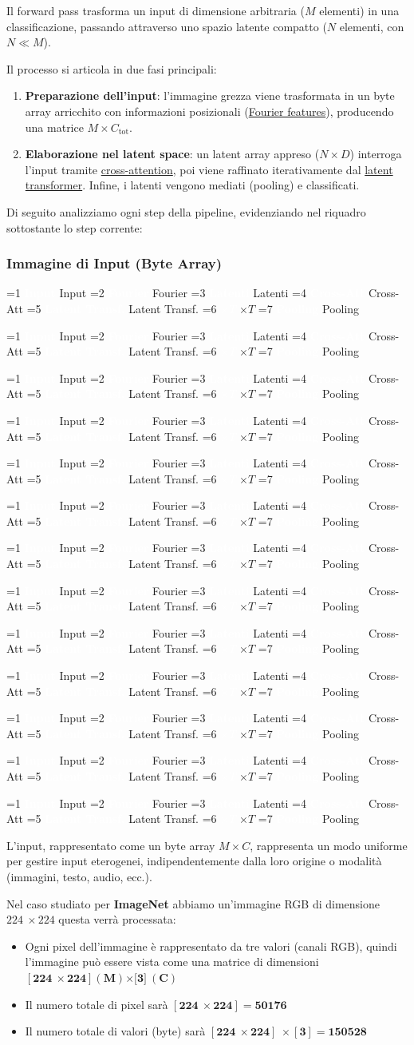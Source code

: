 \documentclass[
  11pt,
]{article}
\newcommand{\pipelinestep}[2]{%
  \ifnum#2=1
    \tikz[baseline=(n.base)]{\node[draw=seccolor, fill=seccolor!15, rounded corners=2pt,
      inner sep=2pt, font=\footnotesize\bfseries] (n) {#1};}%
  \else
    \tikz[baseline=(n.base)]{\node[draw=boxframe, rounded corners=2pt,
      inner sep=2pt, font=\footnotesize] (n) {#1};}%
  \fi
}
\newcommand{\parr}{{\footnotesize\;$\to$\;}}
\newcommand{\pipeline}[1]{%
\begin{tcolorbox}[colback=white, colframe=seccolor!60, boxrule=0.6pt, arc=4pt,
  left=4pt, right=4pt, top=5pt, bottom=5pt, title={\footnotesize\bfseries\color{white} Forward Pass Pipeline}, fonttitle=\footnotesize, coltitle=white, colbacktitle=seccolor!70]
\centering
\pipelinestep{Input}{%
  \ifnum#1=1 1\else 0\fi}%
\parr\pipelinestep{Fourier}{%
  \ifnum#1=2 1\else 0\fi}%
\parr\pipelinestep{Embedding}{%
  \ifnum#1=3 1\else 0\fi}%
\parr\pipelinestep{Latent Array}{%
  \ifnum#1=4 1\else 0\fi}%
\parr\pipelinestep{Cross-Att}{%
  \ifnum#1=5 1\else 0\fi}%
\parr\pipelinestep{Res+MLP}{%
  \ifnum#1=6 1\else 0\fi}%
\\[4pt]
\pipelinestep{Latent Transf.}{%
  \ifnum#1=7 1\else 0\fi}%
\parr\pipelinestep{Res+MLP}{%
  \ifnum#1=8 1\else 0\fi}%
\parr\pipelinestep{$\times T$}{%
  \ifnum#1=9 1\else 0\fi}%
\parr\pipelinestep{Pooling}{%
  \ifnum#1=10 1\else 0\fi}%
\parr\pipelinestep{Classifier}{%
  \ifnum#1=11 1\else 0\fi}%
\parr\pipelinestep{Loss}{%
  \ifnum#1=12 1\else 0\fi}%
\end{tcolorbox}
}
\newcommand{\mystripchip}[3]{%
  \setlength{\fboxsep}{2.8pt}%
  \ifnum#3=#1\relax
    \colorbox{seccolor}{\textcolor{white}{\bfseries #2}}%
  \else
    \colorbox{seccolor!8}{\textcolor{seccolor!55}{#2}}%
  \fi}
\newcommand{\mystriparr}{{\fontsize{8}{8}\selectfont\;\textcolor{seccolor!45}{$\rightarrow$}\;}}
\newcommand{\mystrip}[1]{%
\begin{center}
{\sffamily\fontsize{7.5}{9}\selectfont
\mystripchip{1}{Input}{#1}\mystriparr\mystripchip{2}{Fourier}{#1}\mystriparr\mystripchip{3}{Latenti}{#1}\mystriparr%
\mystripchip{4}{Cross-Att}{#1}\mystriparr\mystripchip{5}{Latent Transf.}{#1}\mystriparr%
\mystripchip{6}{$\times T$}{#1}\mystriparr\mystripchip{7}{Pooling}{#1}}
\end{center}}
\renewcommand{\pipeline}[1]{%
  \ifcase#1\relax
    \mystrip{0}%
    \or\mystrip{1}%
    \or\mystrip{2}%
    \or\mystrip{2}%
    \or\mystrip{3}%
    \or\mystrip{4}%
    \or\mystrip{4}%
    \or\mystrip{5}%
    \or\mystrip{5}%
    \or\mystrip{6}%
    \or\mystrip{7}%
    \or\mystrip{7}%
    \or\mystrip{7}%
  \fi}
\begin{document}
Il forward pass trasforma un input di dimensione arbitraria ($M$ elementi) in una classificazione, passando attraverso uno spazio latente compatto ($N$ elementi, con $N \ll M$).

Il processo si articola in due fasi principali:
\begin{enumerate}
\item \textbf{Preparazione dell'input}: l'immagine grezza viene trasformata in un byte array arricchito con informazioni posizionali (\hyperref[app:fourier]{Fourier features}), producendo una matrice $M \times C_{\text{tot}}$.
\item \textbf{Elaborazione nel latent space}: un latent array appreso ($N \times D$) interroga l'input tramite \hyperref[sec:cross-att]{cross-attention}, poi viene raffinato iterativamente dal \hyperref[sec:latent-transformer]{latent transformer}. Infine, i latenti vengono mediati (pooling) e classificati.
\end{enumerate}

Di seguito analizziamo ogni step della pipeline, evidenziando nel riquadro sottostante lo step corrente:

\subsubsection{Immagine di Input (Byte Array)}

\pipeline{1}

L'input, rappresentato come un byte array
\(M \times C\), rappresenta un modo uniforme per gestire input
eterogenei, indipendentemente dalla loro origine o modalità (immagini,
testo, audio, ecc.).

Nel caso studiato per \textbf{ImageNet} abbiamo un'immagine RGB di
dimensione \(224\  \times 224\) questa verrà processata:

\begin{itemize}
\item
  Ogni pixel dell'immagine è rappresentato da tre valori
  (canali RGB), quindi l'immagine può essere vista come
  una matrice di dimensioni
  \(\left\lbrack \mathbf{224\  \times 224} \right\rbrack\left( \mathbf{M} \right)\mathbf{\times \lbrack 3\rbrack\ (C)}\ \)
\item
  Il numero totale di pixel sarà
  \(\left\lbrack \mathbf{224\  \times 224} \right\rbrack\mathbf{= 50176}\)
\item
  Il numero totale di valori (byte) sarà
  \(\left\lbrack \mathbf{224\  \times 224} \right\rbrack\mathbf{\  \times}\left\lbrack \mathbf{3} \right\rbrack\mathbf{= 150528}\)
\end{itemize}
\end{document}
